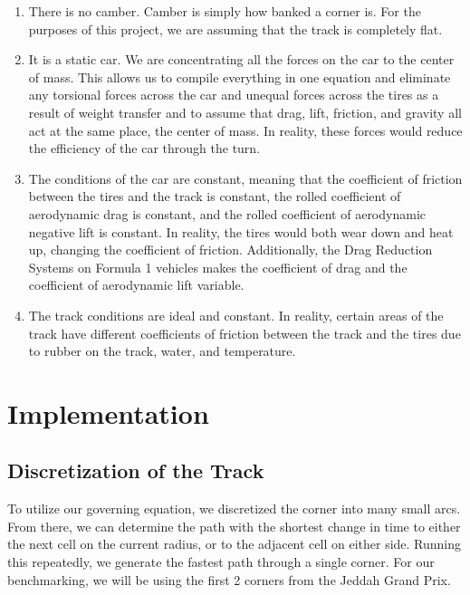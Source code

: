 \documentclass{article}
\begin{document}
\begin{enumerate}

\item There is no camber. Camber is simply how banked a corner is. For the purposes of this project, we are assuming that the track is completely flat.
\item It is a static car. We are concentrating all the forces on the car to the center of mass. This allows us to compile everything in one equation and eliminate any torsional forces across the car and unequal forces across the tires as a result of weight transfer and to assume that drag, lift, friction, and gravity all act at the same place, the center of mass. In reality, these forces would reduce the efficiency of the car through the turn.

\item The conditions of the car are constant, meaning that the coefficient of friction between the tires and the track is constant, the rolled coefficient of aerodynamic drag is constant, and the rolled coefficient of aerodynamic negative lift is constant. In reality, the tires would both wear down and heat up, changing the coefficient of friction. Additionally, the Drag Reduction Systems on Formula 1 vehicles makes the coefficient of drag and the coefficient of aerodynamic lift variable.

\item The track conditions are ideal and constant. In reality, certain areas of the track have different coefficients of friction between the track and the tires due to rubber on the track, water, and temperature.

\end{enumerate}

\section{Implementation}

\subsection{Discretization of the Track}
To utilize our governing equation, we discretized the corner into many small arcs. From there, we can determine the path with the shortest change in time to either the next cell on the current radius, or to the adjacent cell on either side. Running this repeatedly, we generate the fastest path through a single corner. For our benchmarking, we will be using the first 2 corners from the Jeddah Grand Prix.
\break \break
\end{document}
